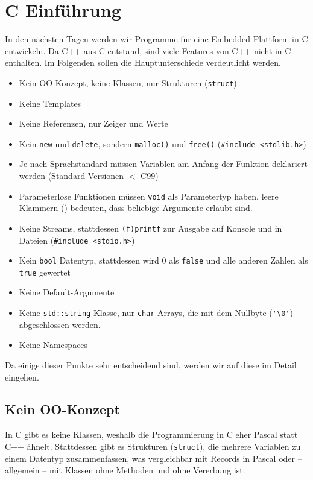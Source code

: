 \section{C Einführung}
In den nächsten Tagen werden wir Programme für eine Embedded Plattform in C entwickeln.
Da C++ aus C entstand, sind viele Features von C++ nicht in C enthalten. Im Folgenden sollen die Hauptunterschiede verdeutlicht werden.

\begin{itemize}
	\item Kein OO-Konzept, keine Klassen, nur Strukturen (\texttt{struct}).
	\item Keine Templates
	\item Keine Referenzen, nur Zeiger und Werte
	\item Kein \texttt{new} und \texttt{delete}, sondern \texttt{malloc()} und \texttt{free()} (\verb|#include <stdlib.h>|)
	\item Je nach Sprachstandard müssen Variablen am Anfang der Funktion deklariert werden (Standard-Versionen $<$ C99)
	\item Parameterlose Funktionen müssen \texttt{void} als Parametertyp haben, leere Klammern () bedeuten, dass beliebige Argumente erlaubt sind.
	\item Keine Streams, stattdessen \texttt{(f)printf} zur Ausgabe auf Konsole und in Dateien (\verb|#include <stdio.h>|)
	\item Kein \texttt{bool} Datentyp, stattdessen wird 0 als \texttt{false} und alle anderen Zahlen als \texttt{true} gewertet
	\item Keine Default-Argumente
	\item Keine \texttt{std::string} Klasse, nur \texttt{char}-Arrays, die mit dem Nullbyte (\verb|'\0'|) abgeschlossen werden.
	\item Keine Namespaces
\end{itemize}

Da einige dieser Punkte sehr entscheidend sind, werden wir auf diese im Detail eingehen.

\subsection{Kein OO-Konzept}
In C gibt es keine Klassen, weshalb die Programmierung in C eher Pascal statt C++ ähnelt.
Stattdessen gibt es Strukturen (\texttt{struct}), die mehrere Variablen zu einem Datentyp zusammenfassen, was vergleichbar mit Records in Pascal oder -- allgemein -- mit Klassen ohne Methoden und ohne Vererbung ist.

